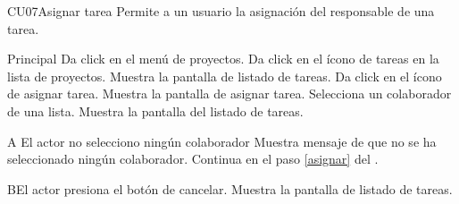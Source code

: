 
% 



	\begin{UseCase}{CU07}{Asignar tarea}{
		Permite a un usuario la asignación del responsable de una tarea.
	}
	\end{UseCase}
	\begin{UCtrayectoria}{Principal}
		\UCpaso[\UCactor]Da click en el menú de proyectos.
       \UCpaso [\UCactor]Da click en el ícono de tareas en la lista de proyectos.
      \UCpaso  Muestra la pantalla de listado de tareas. 
      \UCpaso [\UCactor]Da click en el ícono de asignar tarea. 
      \UCpaso Muestra la pantalla de asignar tarea. \label{asignar}
      \UCpaso[\UCactor] Selecciona un colaborador de una lista.     
       \UCpaso   Muestra la pantalla del listado de tareas.
	\end{UCtrayectoria}

		\begin{UCtrayectoriaA}{A}{ El actor no selecciono ningún colaborador}
			\UCpaso Muestra mensaje de que no se ha seleccionado ningún colaborador.
			\UCpaso Continua en el paso \ref{asignar} del .
		\end{UCtrayectoriaA}
        
        
		\begin{UCtrayectoriaA}{B}{El actor presiona el botón de cancelar.}
			\UCpaso Muestra la pantalla de listado de tareas.
		\end{UCtrayectoriaA}
		
		
